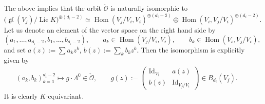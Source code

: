 \documentclass[pdftex]{sigma}
\numberwithin{equation}{section}
\theoremstyle{definition}
\newcommand{\gl}{\operatorname{\mathfrak{gl}}}
\newcommand{\Lie}{\operatorname{Lie}} %
\newcommand{\Hom}{\operatorname{Hom}}
\newcommand{\unit}{\mathrm{Id}}
\newcommand{\bO}{\mathcal{O}}
\begin{document}
The above implies that the orbit $\check{\bO}$ is naturally isomorphic to
\[
\bigl( \gl(V_j)/\Lie K \bigr)^{\oplus (d_i-2)}
\simeq \Hom(V_j/V_i,V_i)^{\oplus (d_i-2)} \oplus \Hom(V_i,V_j/V_i)^{\oplus (d_i-2)}.
\]
Let us denote an element of the vector space on the right hand side
by
\[
(a_1,\dots ,a_{d_i-2},b_1,\dots ,b_{d_i-2}), \qquad
a_k \in \Hom(V_j/V_i,V_i), \qquad b_k \in \Hom(V_i,V_j/V_i),
\]
and set $a(z) := \sum a_k z^k$, $b(z):= \sum_k b_k z^k$.
Then the isomorphism is explicitly given by
\begin{gather}\label{eq:orbit}
(a_k, b_k)_{k=1}^{d_i-2} \longmapsto
g \cdot \Lambda^0 \in \check{\bO},
\qquad
g(z):= \begin{pmatrix}
\unit_{V_i} & a(z) \\
b(z) & \unit_{V_j/V_i}
\end{pmatrix} \in B_{d_i}(V_j).
\end{gather}
It is clearly $K$-equivariant.
\end{document}
